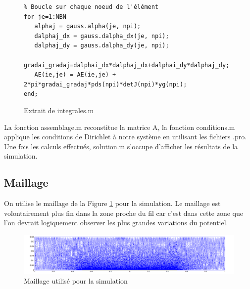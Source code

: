 \documentclass[a4paper,12pt]{article}
\begin{document}


%                         
\begin{figure}[h]
\begin{verbatim}
% Boucle sur chaque noeud de l'élément  
for je=1:NBN
   alphaj = gauss.alpha(je, npi);
   dalphaj_dx = gauss.dalpha_dx(je, npi);
   dalphaj_dy = gauss.dalpha_dy(je, npi);
   gradai_gradaj=dalphai_dx*dalphaj_dx+dalphai_dy*dalphaj_dy;
   AE(ie,je) = AE(ie,je) + 2*pi*gradai_gradaj*pds(npi)*detJ(npi)*yg(npi);
end;
\end{verbatim}
\caption{Extrait de integrales.m}
\end{figure}

La fonction assemblage.m reconstitue la matrice A, la fonction conditions.m applique les conditions de Dirichlet à notre système en utilisant les fichiers .pro. Une fois les calculs effectués, solution.m s'occupe d'afficher les résultats de la simulation.


\subsection{Maillage}
On utilise le maillage de la Figure \ref{f mesh} pour la simulation. Le maillage est volontairement plus fin dans la zone proche du fil car c'est dans cette zone que l'on devrait logiquement observer les plus grandes variations du potentiel.
\begin{figure}[h]
\centering
\includegraphics[width=1\textwidth,height=0.25 \textwidth]{images/mesh}
\caption{Maillage utilisé pour la simulation}
\label{f mesh}
\end{figure}
\end{document}
